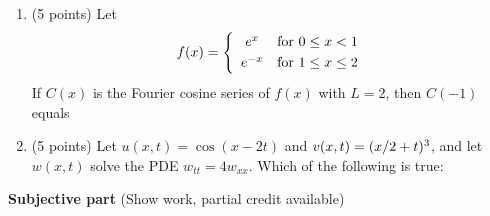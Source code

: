 \documentclass{article}
\begin{document}
\begin{enumerate}
\item (5 points)  Let
\[
f(x)=\left\{
\begin{array}{cl}
e\sp{x} & \hbox{for $0\le x<1$}\smallskip\\
e\sp{-x} & \hbox{for $1\le x\le 2$}
\end{array}
\right.
\]
If $C(x)$ is the Fourier cosine series of $f(x)$ with $L=2$, then $C(-1)$ equals

\bigskip
\item (5 points) Let $u(x,t)=\cos(x-2t)$ and $v(x,t)=(x/2+t)\sp3$, and let $w(x,t)$ solve the PDE $w_{tt}=4w_{xx}$.  Which of the following is true:
\end{enumerate}

\newpage\noindent
{\bf Subjective part} (Show work, partial credit available)
\end{document}
